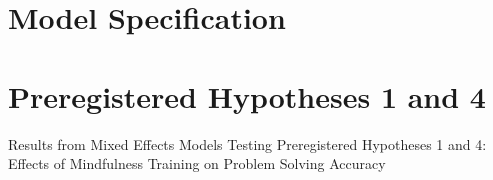\documentclass[
  letterpaper,
  DIV=11,
  numbers=noendperiod]{scrreprt}
\begin{document}
\section{Model Specification}\label{model-specification-2}

\section{Preregistered Hypotheses 1 and
4}\label{preregistered-hypotheses-1-and-4}

\begin{table}

\caption{\label{tbl-accuracy-results}Results from Mixed Effects Models
Testing Preregistered Hypotheses 1 and 4: Effects of Mindfulness
Training on Problem Solving Accuracy}

\centering{

\centering\begingroup\fontsize{8}{10}\selectfont

}
\end{table}
\end{document}

